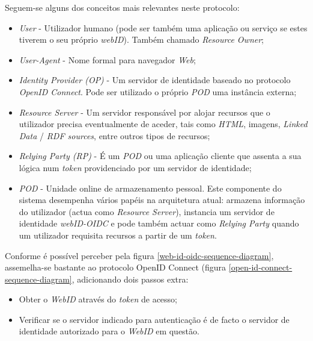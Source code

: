 Seguem-se alguns dos conceitos mais relevantes neste protocolo:
\begin{itemize}
    \item \emph{User} - Utilizador humano (pode ser também uma aplicação ou serviço se estes tiverem o seu próprio \emph{webID}). Também chamado \emph{Resource Owner};
    \item \emph{User-Agent} - Nome formal para navegador \emph{Web};
    \item \emph{Identity Provider (OP)} - Um servidor de identidade baseado no protocolo \emph{OpenID Connect}. Pode ser utilizado o próprio \emph{POD} uma instância externa;
    \item \emph{Resource Server} - Um servidor responsável por alojar recursos que o utilizador precisa eventualmente de aceder, tais como \emph{HTML}, imagens, \emph{Linked Data} / \emph{RDF sources}, entre outros tipos de recursos;
    \item \emph{Relying Party (RP)} - É um \emph{POD} ou uma aplicação cliente que assenta a sua lógica num \emph{token} providenciado por um servidor de identidade;
    \item \emph{POD} - Unidade online de armazenamento pessoal. Este componente do sistema desempenha vários papéis na arquitetura atual: armazena informação do utilizador (actua como \emph{Resource Server}), instancia um servidor de identidade \emph{webID-OIDC} e pode também actuar como \emph{Relying Party} quando um utilizador requisita recursos a partir de um \emph{token}.
\end{itemize}



Conforme é possível perceber pela figura \ref{web-id-oidc-sequence-diagram}, assemelha-se bastante ao protocolo OpenID Connect (figura \ref{open-id-connect-sequence-diagram}, adicionando dois passos extra\cite{solid_webid_oidc}:
\begin{itemize}
    \item Obter o \emph{WebID} através do \emph{token} de acesso;
    \item Verificar se o servidor indicado para autenticação é de facto o servidor de identidade autorizado para o \emph{WebID} em questão.
\end{itemize}


